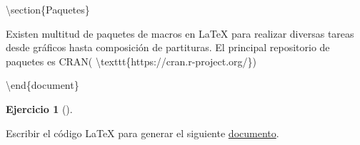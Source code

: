 \documentclass[
  a4paper,
]{scrreport}
\newenvironment{Shaded}{\begin{snugshade}}{\end{snugshade}}
\newcommand{\ExtensionTok}[1]{\textcolor[rgb]{0.00,0.23,0.31}{#1}}
\newcommand{\FunctionTok}[1]{\textcolor[rgb]{0.28,0.35,0.67}{#1}}
\newcommand{\KeywordTok}[1]{\textcolor[rgb]{0.00,0.23,0.31}{#1}}
\newcommand{\NormalTok}[1]{\textcolor[rgb]{0.00,0.23,0.31}{#1}}
\theoremstyle{definition}
\newtheorem{exercise}{Ejercicio}[chapter]
\theoremstyle{remark}
\begin{document}
\begin{tcolorbox}
\begin{Shaded}
\begin{Highlighting}[]
\KeywordTok{\textbackslash{}section}\NormalTok{\{Paquetes\}}

\NormalTok{Existen multitud de paquetes de macros en LaTeX para realizar diversas tareas desde gráficos hasta composición de partituras. El principal repositorio de paquetes es CRAN( }\FunctionTok{\textbackslash{}texttt}\NormalTok{\{https://cran.r{-}project.org/\})}

\KeywordTok{\textbackslash{}end}\NormalTok{\{}\ExtensionTok{document}\NormalTok{\}}
\end{Highlighting}
\end{Shaded}

\end{tcolorbox}

\begin{exercise}[]\protect\hypertarget{exr-listas-anidadas}{}\label{exr-listas-anidadas}

Escribir el código LaTeX para generar el siguiente
\href{doc/ejercicio3.pdf}{documento}.

\begin{tcolorbox}[enhanced jigsaw, left=2mm, colbacktitle=quarto-callout-note-color!10!white, toprule=.15mm, coltitle=black, leftrule=.75mm, arc=.35mm, colback=white, opacitybacktitle=0.6, rightrule=.15mm, colframe=quarto-callout-note-color-frame, title=\textcolor{quarto-callout-note-color}{\faInfo}\hspace{0.5em}{Ver documento}, bottomrule=.15mm, breakable, opacityback=0, bottomtitle=1mm, toptitle=1mm, titlerule=0mm]

\end{tcolorbox}

\end{exercise}
\end{document}
